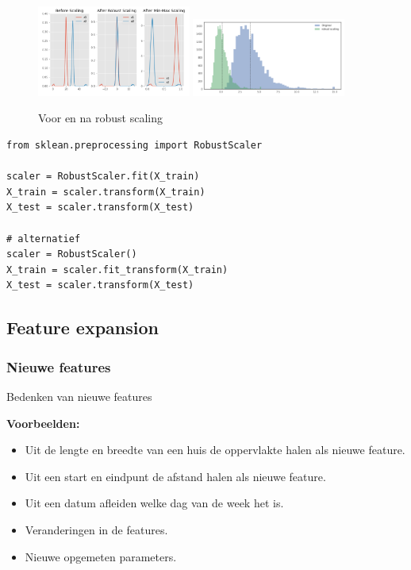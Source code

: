 \documentclass{article}
\begin{document}
\begin{figure}[H]
    \centering
    \includegraphics[width=0.45\textwidth]{robust-scaling.png}
    \includegraphics[width=0.45\textwidth]{robust-scaling2.png}
    \caption{Voor en na robust scaling}
\end{figure}

\begin{verbatim}
from sklean.preprocessing import RobustScaler

scaler = RobustScaler.fit(X_train)
X_train = scaler.transform(X_train)
X_test = scaler.transform(X_test)

# alternatief
scaler = RobustScaler()
X_train = scaler.fit_transform(X_train)
X_test = scaler.transform(X_test)
\end{verbatim}

\subsection{Feature expansion}

\subsubsection{Nieuwe features}

Bedenken van nieuwe features

\textbf{Voorbeelden:}

\begin{itemize}
    \item Uit de lengte en breedte van een huis de oppervlakte halen als nieuwe feature.
    \item Uit een start en eindpunt de afstand halen als nieuwe feature.
    \item Uit een datum afleiden welke dag van de week het is.
    \item Veranderingen in de features.
    \item Nieuwe opgemeten parameters.
\end{itemize}
\end{document}
